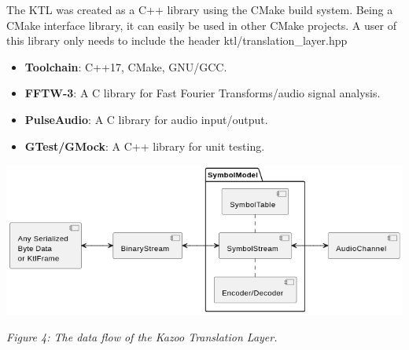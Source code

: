 \documentclass[]{article}
\begin{document}
The KTL was created as a C++ library using the CMake build system. Being a CMake interface library, it can easily be used in other CMake projects. A user of this library only needs to include the header ktl/translation\_layer.hpp

\begin{itemize}
  \item \textbf{Toolchain}: C++17, CMake, GNU/GCC.
  \item \textbf{FFTW-3}: A C library for Fast Fourier Transforms/audio signal analysis.
  \item \textbf{PulseAudio}: A C library for audio input/output.
  \item \textbf{GTest/GMock}: A C++ library for unit testing.
\end{itemize}

\begin{center}
  \includegraphics[width=0.8\linewidth]{images/ktl_flow.png}

  \textit{Figure 4: The data flow of the Kazoo Translation Layer.}
\end{center}
\end{document}
